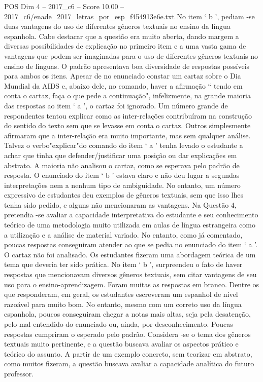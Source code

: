\begin{textsample}{POS Dim 4 – 2017\_c6 – Score 10.00 – 2017\_c6/enade\_2017\_letras\_por\_esp\_f454913e6e.txt}
No item ‘ b ’, pediam -se duas vantagens do uso de diferentes gêneros textuais no ensino da língua espanhola.
Cabe destacar que a questão era muito aberta, dando margem a diversas possibilidades de explicação no primeiro item e a uma vasta gama de vantagens que podem ser imaginadas para o uso de diferentes gêneros textuais no ensino de línguas.
O padrão apresentava boa diversidade de respostas possíveis para ambos os itens.
Apesar de no enunciado constar um cartaz sobre o Dia Mundial da AIDS e, abaixo dele, no comando, haver a afirmação “ tendo em conta o cartaz, faça o que pede a continuação", infelizmente, na grande maioria das respostas ao item ‘ a ’, o cartaz foi ignorado.
Um número grande de respondentes tentou explicar como as inter-relações contribuíram na construção do sentido do texto sem que se levasse em conta o cartaz.
Outros simplesmente afirmaram que a inter-relação era muito importante, mas sem qualquer análise.
Talvez o verbo"explicar"do comando do item ‘ a ’ tenha levado o estudante a achar que tinha que defender/justificar uma posição ou dar explicações em abstrato.
A maioria não analisou o cartaz, como se esperava pelo padrão de resposta.
O enunciado do item ‘ b ’ estava claro e não deu lugar a segundas interpretações nem a nenhum tipo de ambiguidade.
No entanto, um número expressivo de estudantes deu exemplos de gêneros textuais, sem que isso lhes tenha sido pedido, e alguns não mencionaram as vantagens.
Na Questão 4, pretendia -se avaliar a capacidade interpretativa do estudante e seu conhecimento teórico de uma metodologia muito utilizada em aulas de língua estrangeira como a utilização e a análise de material variado.
No entanto, como já comentado, poucas respostas conseguiram atender ao que se pedia no enunciado do item ‘ a ’.
O cartaz não foi analisado.
Os estudantes fizeram uma abordagem teórica de um tema que deveria ter sido prática.
No item ‘ b ’, surpreendeu o fato de haver respostas que mencionavam diversos gêneros textuais, sem citar vantagens de seu uso para o ensino-aprendizagem.
Foram muitas as respostas em branco.
Dentre os que responderam, em geral, os estudantes escreveram um espanhol de nível razoável para muito bom.
No entanto, mesmo com um correto uso da língua espanhola, poucos conseguiram chegar a notas mais altas, seja pela desatenção, pelo mal-entendido do enunciado ou, ainda, por desconhecimento.
Poucas respostas cumpriram o esperado pelo padrão.
Considera -se o tema dos gêneros textuais muito pertinente, e a questão buscava avaliar os aspectos prático e teórico do assunto.
A partir de um exemplo concreto, sem teorizar em abstrato, como muitos fizeram, a questão buscava avaliar a capacidade analítica do futuro professor.

\end{textsample}

